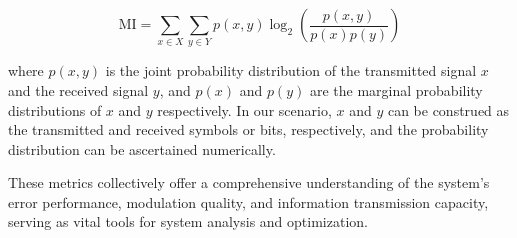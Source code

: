 \begin{equation}
\text{MI} = \sum_{x \in X} \sum_{y \in Y} p(x, y) \log_2\left(\frac{p(x, y)}{p(x)p(y)}\right)
\end{equation}

where \( p(x, y) \) is the joint probability distribution of the transmitted signal \( x \) and the received signal \( y \), and \( p(x) \) and \( p(y) \) are the marginal probability distributions of \( x \) and \( y \) respectively. In our scenario, 
\( x \) and \( y \) can be construed as the transmitted and received symbols or bits, respectively, and the probability distribution can be ascertained numerically.

These metrics collectively offer a comprehensive understanding of the system's error performance, modulation quality, and information transmission capacity, serving as vital tools for system analysis and optimization.








